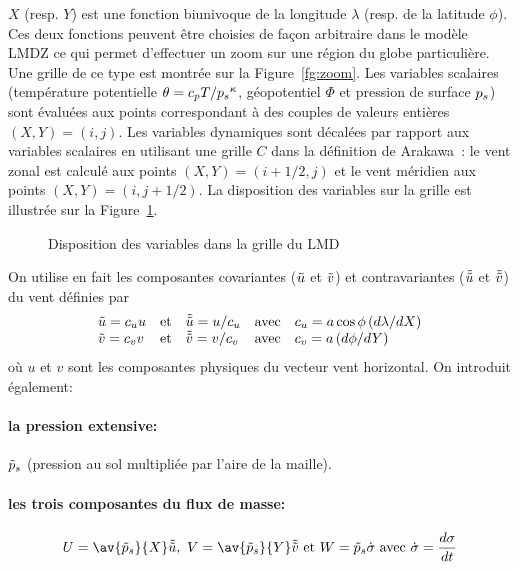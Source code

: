 $X$ (resp. $Y$) est une fonction biunivoque de la longitude $\lambda$
(resp. de la latitude $\phi$). Ces deux fonctions peuvent \^etre choisies
de fa\c{c}on arbitraire dans le mod\`ele LMDZ ce qui permet d'effectuer un
zoom sur une r\'egion du globe particuli\`ere. Une grille de ce type est montr\'ee
sur la Figure~\ref{fg:zoom}.
Les variables scalaires
(temp\'erature potentielle $\theta = c_p T/{p_s}^\kappa$, g\'eopotentiel $\Phi$
et pression de surface $p_s$) sont \'evalu\'ees aux points
correspondant \`a des couples de valeurs enti\`eres $(X,Y)=(i,j)$.
Les variables dynamiques sont d\'ecal\'ees par rapport aux variables
scalaires en utilisant une grille $C$ dans la d\'efinition de
Arakawa~\cite{Arak:77}: le vent zonal est calcul\'e
aux points $(X,Y)=(i+1/2,j)$ et  le vent
m\'eridien aux points $(X,Y)=(i,j+1/2)$.
La disposition des variables sur la grille est illustr\'ee sur la
Figure~\ref{fg:grille}.

\begin{figure}
\centerline{}
\caption{Disposition des variables dans la grille du LMD}
\label{fg:grille}
\end{figure}


On utilise en fait les composantes covariantes
($\tilde{u}$ et $\tilde{v}$) et contravariantes ($\tilde{\tilde{u}}$ et $\tilde{\tilde{v}}$)
du vent d\'efinies par
\begin{equation}
\begin{array}{llllllllll}
\tilde{u} = c_u u & \mbox{et} & \tilde{\tilde{u}} = u / c_u & \mbox{avec} & 
c_u = a \cos{\phi} \left( d\lambda/dX \right)  \\
\tilde{v} = c_v v & \mbox{et} & \tilde{\tilde{v}} = v / c_v & \mbox{avec} &
c_v = a \left( d\phi / dY \right)
\end{array}
\end{equation}
%
o\`u $u$ et $v$ sont les composantes physiques du vecteur vent
horizontal.
On introduit \'egalement:
%
\paragraph{la pression extensive:}
$\tilde{p}_s$ (pression au sol multipli\'ee
par l'aire de la maille).
%
\paragraph{les trois composantes du flux de masse:}
\begin{equation}
U=\av{\pext}{X} \ucont ,\  V= \av{\pext}{Y} \vcont \  \mbox{et} \  
W= \pext \dot{\sigma}
\ \mbox{avec}\ \dot{\sigma}=\frac{d\sigma}{dt}
\end{equation}
%
